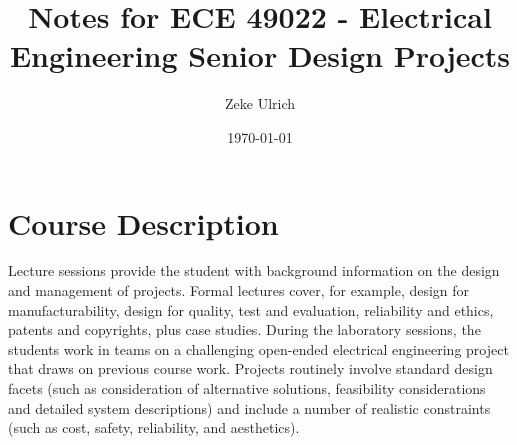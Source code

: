 \documentclass[nobib]{tufte-handout}
\title{Notes for ECE 49022 - Electrical Engineering Senior Design Projects}
\author{Zeke Ulrich}
\date{\today}
\begin{document}
\maketitle

\tableofcontents

\section{Course Description}
Lecture sessions provide the student with background information on the design and management of projects. Formal lectures cover, for example, design for manufacturability, design for quality, test and evaluation, reliability and ethics, patents and copyrights, plus case studies. During the laboratory sessions, the students work in teams on a challenging open-ended electrical engineering project that draws on previous course work. Projects routinely involve standard design facets (such as consideration of alternative solutions, feasibility considerations and detailed system descriptions) and include a number of realistic constraints (such as cost, safety, reliability, and aesthetics).
\pagebreak


\end{document}
